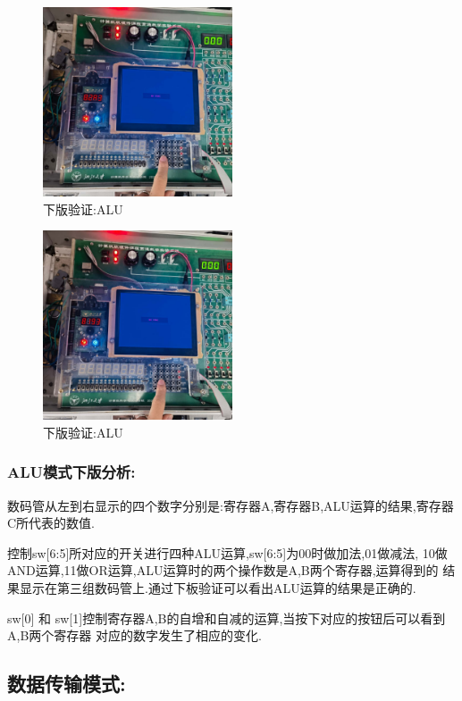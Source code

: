 \documentclass{article}
\begin{document}
    \begin{figure}[H]
    \centering
    \includegraphics[width=0.5\textwidth]{8.jpg}
    \caption{\label{Lab11}下版验证:ALU}
    \end{figure}

    \begin{figure}[H]
    \centering
    \includegraphics[width=0.5\textwidth]{9.jpg}
    \caption{\label{Lab11}下版验证:ALU}
    \end{figure}
    
\subsubsection*{ALU模式下版分析:}
数码管从左到右显示的四个数字分别是:寄存器A,寄存器B,ALU运算的结果,寄存器C所代表的数值.

控制sw[6:5]所对应的开关进行四种ALU运算,sw[6:5]为00时做加法,01做减法,
10做AND运算,11做OR运算,ALU运算时的两个操作数是A,B两个寄存器,运算得到的
结果显示在第三组数码管上.通过下板验证可以看出ALU运算的结果是正确的.

sw[0] 和 sw[1]控制寄存器A,B的自增和自减的运算,当按下对应的按钮后可以看到A,B两个寄存器
对应的数字发生了相应的变化.

\subsection*{数据传输模式:}
\end{document}

